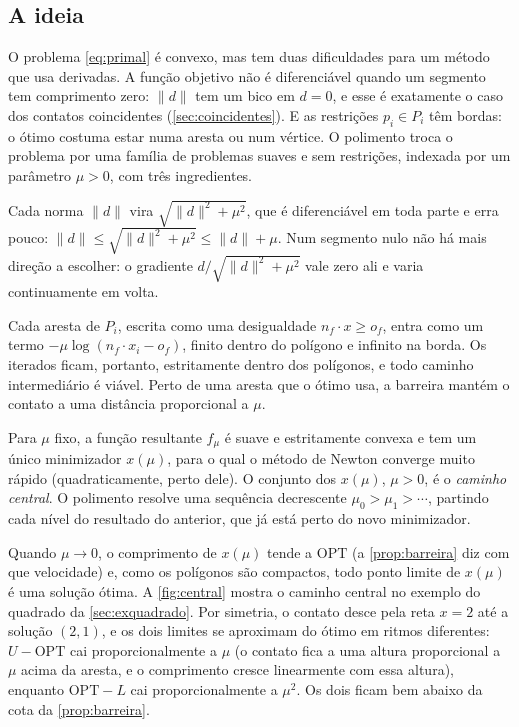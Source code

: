 \documentclass[11pt,a4paper]{article}
\theoremstyle{plain}\newtheorem{proposicao}{Proposição}
\theoremstyle{definition}\newtheorem{definicao}{Definição}
\theoremstyle{plain}\newtheorem{teorema}{Teorema}
\newcommand{\norm}[1]{\lVert#1\rVert}
\newcommand{\OPT}{\mathrm{OPT}}
\begin{document}
\subsection{A ideia}\label{sec:polimento-ideia}
O problema \eqref{eq:primal} é convexo, mas tem duas dificuldades para um método que usa derivadas. A função objetivo não é diferenciável quando um segmento tem comprimento zero: \(\norm d\) tem um bico em \(d=0\), e esse é exatamente o caso dos contatos coincidentes (\cref{sec:coincidentes}). E as restrições \(p_i\in P_i\) têm bordas: o ótimo costuma estar numa aresta ou num vértice. O polimento troca o problema por uma família de problemas suaves e sem restrições, indexada por um parâmetro \(\mu>0\), com três ingredientes.
\begin{description}[leftmargin=0pt,itemsep=1pt,font=\bfseries\color{navy}]
\item[Suavização.] Cada norma \(\norm d\) vira \(\sqrt{\norm d^2+\mu^2}\), que é diferenciável em toda parte e erra pouco: \(\norm d\le\sqrt{\norm d^2+\mu^2}\le\norm d+\mu\). Num segmento nulo não há mais direção a escolher: o gradiente \(d/\sqrt{\norm d^2+\mu^2}\) vale zero ali e varia continuamente em volta.
\item[Barreira logarítmica.] Cada aresta de \(P_i\), escrita como uma desigualdade \(n_f\cdot x\ge o_f\), entra como um termo \(-\mu\log(n_f\cdot x_i-o_f)\), finito dentro do polígono e infinito na borda. Os iterados ficam, portanto, estritamente dentro dos polígonos, e todo caminho intermediário é viável. Perto de uma aresta que o ótimo usa, a barreira mantém o contato a uma distância proporcional a \(\mu\).
\item[Newton com continuação.] Para \(\mu\) fixo, a função resultante \(f_\mu\) é suave e estritamente convexa e tem um único minimizador \(x(\mu)\), para o qual o método de Newton converge muito rápido (quadraticamente, perto dele). O conjunto dos \(x(\mu)\), \(\mu>0\), é o \emph{caminho central}. O polimento resolve uma sequência decrescente \(\mu_0>\mu_1>\cdots\), partindo cada nível do resultado do anterior, que já está perto do novo minimizador.
\end{description}
Quando \(\mu\to0\), o comprimento de \(x(\mu)\) tende a \(\OPT\) (a \cref{prop:barreira} diz com que velocidade) e, como os polígonos são compactos, todo ponto limite de \(x(\mu)\) é uma solução ótima. A \cref{fig:central} mostra o caminho central no exemplo do quadrado da \cref{sec:exquadrado}. Por simetria, o contato desce pela reta \(x=2\) até a solução \((2,1)\), e os dois limites se aproximam do ótimo em ritmos diferentes: \(U-\OPT\) cai proporcionalmente a \(\mu\) (o contato fica a uma altura proporcional a \(\mu\) acima da aresta, e o comprimento cresce linearmente com essa altura), enquanto \(\OPT-L\) cai proporcionalmente a \(\mu^2\). Os dois ficam bem abaixo da cota da \cref{prop:barreira}.
\end{document}
